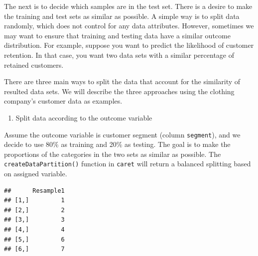 \documentclass[
  12pt,
]{krantz}
\makeatletter
\newenvironment{Shaded}{\begin{snugshade}}{\end{snugshade}}
\newcommand{\AttributeTok}[1]{\textcolor[rgb]{0.61,0.61,0.61}{#1}}
\newcommand{\CommentTok}[1]{\textcolor[rgb]{0.37,0.37,0.37}{\textit{#1}}}
\newcommand{\ConstantTok}[1]{\textcolor[rgb]{0,0,0}{#1}}
\newcommand{\DecValTok}[1]{\textcolor[rgb]{0.06,0.06,0.06}{#1}}
\newcommand{\FloatTok}[1]{\textcolor[rgb]{0.06,0.06,0.06}{#1}}
\newcommand{\FunctionTok}[1]{\textcolor[rgb]{0,0,0}{#1}}
\newcommand{\NormalTok}[1]{#1}
\newcommand{\OtherTok}[1]{\textcolor[rgb]{0.37,0.37,0.37}{#1}}
\newcommand{\SpecialCharTok}[1]{\textcolor[rgb]{0,0,0}{#1}}
\newcommand{\StringTok}[1]{\textcolor[rgb]{0.5,0.5,0.5}{#1}}
\providecommand{\tightlist}{%
  \setlength{\itemsep}{0pt}\setlength{\parskip}{0pt}}
\newenvironment{kframe}{%
\medskip{}
\setlength{\fboxsep}{.8em}
 \def\at@end@of@kframe{}%
 \ifinner\ifhmode%
  \def\at@end@of@kframe{\end{minipage}}%
  \begin{minipage}{\columnwidth}%
 \fi\fi%
 \def\FrameCommand##1{\hskip\@totalleftmargin \hskip-\fboxsep
 \colorbox{shadecolor}{##1}\hskip-\fboxsep
     \hskip-\linewidth \hskip-\@totalleftmargin \hskip\columnwidth}%
 \MakeFramed {\advance\hsize-\width
   \@totalleftmargin\z@ \linewidth\hsize
   \@setminipage}}%
 {\par\unskip\endMakeFramed%
 \at@end@of@kframe}
\renewenvironment{Shaded}{\begin{kframe}}{\end{kframe}}
\makeatother
\begin{document}
The next is to decide which samples are in the test set. There is a desire to make the training and test sets as similar as possible. A simple way is to split data randomly, which does not control for any data attributes. However, sometimes we may want to ensure that training and testing data have a similar outcome distribution. For example, suppose you want to predict the likelihood of customer retention. In that case, you want two data sets with a similar percentage of retained customers.

There are three main ways to split the data that account for the similarity of resulted data sets. We will describe the three approaches using the clothing company's customer data as examples.

\begin{enumerate}
\def\labelenumi{(\arabic{enumi})}
\tightlist
\item
  Split data according to the outcome variable
\end{enumerate}

Assume the outcome variable is customer segment (column \texttt{segment}), and we decide to use 80\% as training and 20\% as testing. The goal is to make the proportions of the categories in the two sets as similar as possible. The \texttt{createDataPartition()} function in \texttt{caret} will return a balanced splitting based on assigned variable.

\begin{Shaded}
\end{Shaded}

\begin{verbatim}
##      Resample1
## [1,]         1
## [2,]         2
## [3,]         3
## [4,]         4
## [5,]         6
## [6,]         7
\end{verbatim}
\end{document}
